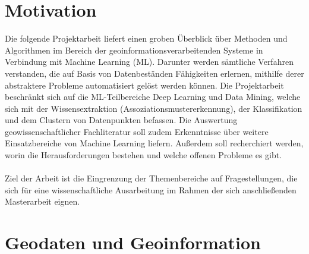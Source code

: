 \documentclass[11pt,ceqn]{book}
\begin{document}
\chapter{Motivation}
Die folgende Projektarbeit liefert einen groben Überblick über Methoden und Algorithmen im Bereich der geoinformationsverarbeitenden Systeme in Verbindung mit Machine Learning (ML). Darunter werden sämtliche Verfahren verstanden, die auf Basis von Datenbeständen Fähigkeiten erlernen, mithilfe derer abstraktere Probleme automatisiert gelöst werden können. Die Projektarbeit beschränkt sich auf die ML-Teilbereiche Deep Learning und Data Mining, welche sich mit der Wissensextraktion (Assoziationsmustererkennung), der Klassifikation und dem Clustern von Datenpunkten befassen. Die Auswertung geowissenschaftlicher Fachliteratur soll zudem Erkenntnisse über weitere Einsatzbereiche von Machine Learning liefern. Außerdem soll recherchiert werden, worin die Herausforderungen bestehen und welche offenen Probleme es gibt.
\\~\\
Ziel der Arbeit ist die Eingrenzung der Themenbereiche auf Fragestellungen, die sich für eine wissenschaftliche Ausarbeitung im Rahmen der sich anschließenden Masterarbeit eignen.

\chapter{Geodaten und Geoinformation}
\end{document}
